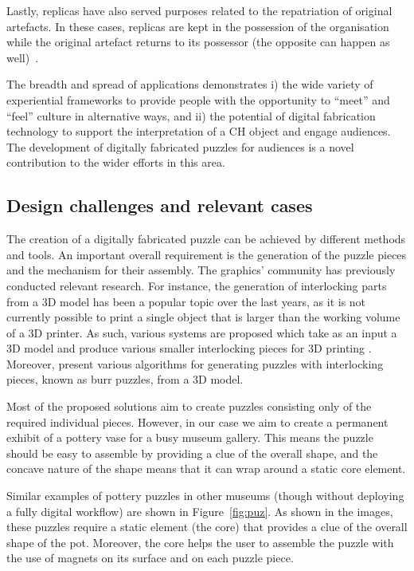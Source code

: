 \documentclass[acmlarge,screen,dvipsnames]{acmart}
\begin{document}
Lastly, replicas have also served purposes related to the repatriation
of original artefacts. In these cases, replicas are kept in the
possession of the organisation while the original artefact returns to
its possessor (the opposite can happen as well)~\cite{Hollinger2013}.
 
The breadth and spread of applications demonstrates i) the wide
variety of experiential frameworks to provide people with the
opportunity to ``meet'' and ``feel'' culture in alternative ways, and
ii) the potential of digital fabrication technology to support the
interpretation of a CH object and engage audiences. The development of
digitally fabricated puzzles for audiences is a novel contribution to
the wider efforts in this area.
 
\subsection{Design challenges and relevant cases}
 
%
The creation of a digitally fabricated puzzle can be achieved by
different methods and tools. An important overall requirement is the
generation of the puzzle pieces and the mechanism for their
assembly. The graphics' community has previously conducted relevant
research. For instance, the generation of interlocking parts from a 3D
model has been a popular topic over the last years, as it is not
currently possible to print a single object that is larger than the
working volume of a 3D printer. As such, various systems are proposed
which take as an input a 3D model and produce various smaller
interlocking pieces for 3D printing
\cite{Song:2015:POI:2797416.2797510,luo_chopper:_2012,klein_interlocking_2014,skouras_interactive_2015}. Moreover,
\cite{Xin:2011:MBP:2010324.1964992,Song:2012:RIP:2366145.2366147,sun_computational_2015}
present various algorithms for generating puzzles with interlocking
pieces, known as burr puzzles, from a 3D model.

Most of the proposed solutions aim to create puzzles consisting only
of the required individual pieces. However, in our case we aim to
create a permanent exhibit of a pottery vase for a busy museum
gallery. This means the puzzle should be easy to assemble by providing
a clue of the overall shape, and the concave nature of the shape means
that it can wrap around a static core element.

Similar examples of pottery puzzles in other museums (though without
deploying a fully digital workflow) are shown in
Figure~\ref{fig:puz}. As shown in the images, these puzzles require a
static element (the core) that provides a clue of the overall shape of
the pot. Moreover, the core helps the user to assemble the puzzle with
the use of magnets on its surface and on each puzzle piece.
\end{document}

